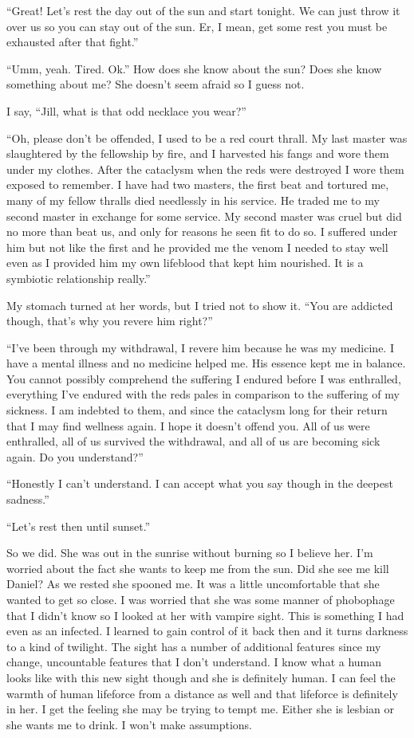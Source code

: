 ``Great! Let's rest the day out of the sun and start tonight. We can just throw it over us so you can stay out of the sun. Er, I mean, get some rest you must be exhausted after that fight.''

``Umm, yeah. Tired. Ok.'' How does she know about the sun? Does she know something about me? She doesn't seem afraid so I guess not.

I say, ``Jill, what is that odd necklace you wear?''

``Oh, please don't be offended, I used to be a red court thrall. My last master was slaughtered by the fellowship by fire, and I harvested his fangs and wore them under my clothes. After the cataclysm when the reds were destroyed I wore them exposed to remember. I have had two masters, the first beat and tortured me, many of my fellow thralls died needlessly in his service. He traded me to my second master in exchange for some service. My second master was cruel but did no more than beat us, and only for reasons he seen fit to do so. I suffered under him but not like the first and he provided me the venom I needed to stay well even as I provided him my own lifeblood that kept him nourished. It is a symbiotic relationship really.''

My stomach turned at her words, but I tried not to show it. ``You are addicted though, that's why you revere him right?''

``I've been through my withdrawal, I revere him because he was my medicine. I have a mental illness and no medicine helped me. His essence kept me in balance. You cannot possibly comprehend the suffering I endured before I was enthralled, everything I've endured with the reds pales in comparison to the suffering of my sickness. I am indebted to them, and since the cataclysm long for their return that I may find wellness again. I hope it doesn't offend you. All of us were enthralled, all of us survived the withdrawal, and all of us are becoming sick again. Do you understand?''

``Honestly I can't understand. I can accept what you say though in the deepest sadness.''

``Let's rest then until sunset.''

So we did. She was out in the sunrise without burning so I believe her. I'm worried about the fact she wants to keep me from the sun. Did she see me kill Daniel? As we rested she spooned me. It was a little uncomfortable that she wanted to get so close. I was worried that she was some manner of phobophage that I didn't know so I looked at her with vampire sight. This is something I had even as an infected. I learned to gain control of it back then and it turns darkness to a kind of twilight. The sight has a number of additional features since my change, uncountable features that I don't understand. I know what a human looks like with this new sight though and she is definitely human. I can feel the warmth of human lifeforce from a distance as well and that lifeforce is definitely in her. I get the feeling she may be trying to tempt me. Either she is lesbian or she wants me to drink. I won't make assumptions.


